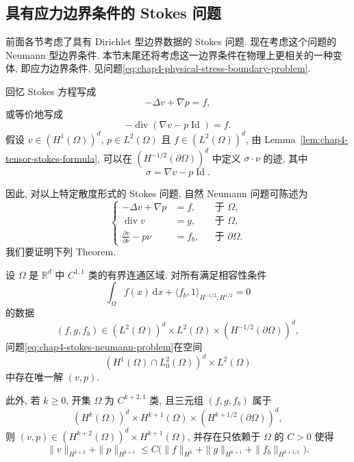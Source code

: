 \subsection{具有应力边界条件的 Stokes 问题}
\label{sec:chap4-stokes-stress-boundary}

\renewcommand{\thestatement}{7.\arabic{statement}}
\renewcommand{\theHstatement}{ch04.sec07.\arabic{statement}}
\setcounter{statement}{0}
\renewcommand{\thechapterfoursectionsevenremark}{7.\arabic{chapterfoursectionsevenremark}}

前面各节考虑了具有 Dirichlet 型边界数据的 Stokes 问题. 现在考虑这个问题的 Neumann 型边界条件. 本节末尾还将考虑这一边界条件在物理上更相关的一种变体, 即应力边界条件, 见问题\eqref{eq:chap4-physical-stress-boundary-problem}.

回忆 Stokes 方程写成
\[
 -\Delta v+\nabla p=f,
\]
或等价地写成
\[
 -\operatorname{div}(\nabla v-p\operatorname{Id})=f.
\]
假设 $v\in(H^1(\Omega))^d$, $p\in L^2(\Omega)$ 且 $f\in(L^2(\Omega))^d$, 由 Lemma~\ref{lem:chap4-tensor-stokes-formula}, 可以在 $(H^{-1/2}(\partial\Omega))^d$ 中定义 $\sigma\cdot\nu$ 的迹, 其中
\[
 \sigma=\nabla v-p\operatorname{Id}.
\]

因此, 对以上特定散度形式的 Stokes 问题, 自然 Neumann 问题可陈述为
\begin{equation}
 \left\{
 \begin{aligned}
  -\Delta v+\nabla p&=f,&&\text{于 }\Omega,\\
  \operatorname{div}v&=g,&&\text{于 }\Omega,\\
  \frac{\partial v}{\partial\nu}-p\nu&=f_b,&&\text{于 }\partial\Omega.
 \end{aligned}
 \right.
 \label{eq:chap4-stokes-neumann-problem}
\end{equation}
我们要证明下列 Theorem.

\begin{Theorem}
\label{thm:chap4-stokes-neumann-wellposedness-regularity}
设 $\Omega$ 是 $\mathbb R^d$ 中 $C^{1,1}$ 类的有界连通区域. 对所有满足相容性条件
\begin{equation}
 \int_\Omega f(x)\,\mathrm dx
 +\langle f_b,1\rangle_{H^{-1/2},H^{1/2}}=0
 \label{eq:chap4-stokes-neumann-compatibility}
\end{equation}
的数据
\[
 (f,g,f_b)\in(L^2(\Omega))^d\times L^2(\Omega)\times(H^{-1/2}(\partial\Omega))^d,
\]
问题\eqref{eq:chap4-stokes-neumann-problem}在空间
\[
 (H^1(\Omega)\cap L_0^2(\Omega))^d\times L^2(\Omega)
\]
中存在唯一解 $(v,p)$.

此外, 若 $k\geq0$, 开集 $\Omega$ 为 $C^{k+2,1}$ 类, 且三元组 $(f,g,f_b)$ 属于
\[
 (H^k(\Omega))^d\times H^{k+1}(\Omega)\times(H^{k+1/2}(\partial\Omega))^d,
\]
则 $(v,p)\in(H^{k+2}(\Omega))^d\times H^{k+1}(\Omega)$, 并存在只依赖于 $\Omega$ 的 $C>0$ 使得
\begin{equation}
 \|v\|_{H^{k+2}}+\|p\|_{H^{k+1}}
 \leq C\bigl(\|f\|_{H^k}+\|g\|_{H^{k+1}}+\|f_b\|_{H^{k+1/2}}\bigr).
 \label{eq:chap4-stokes-neumann-regularity-estimate}
\end{equation}
\end{Theorem}

